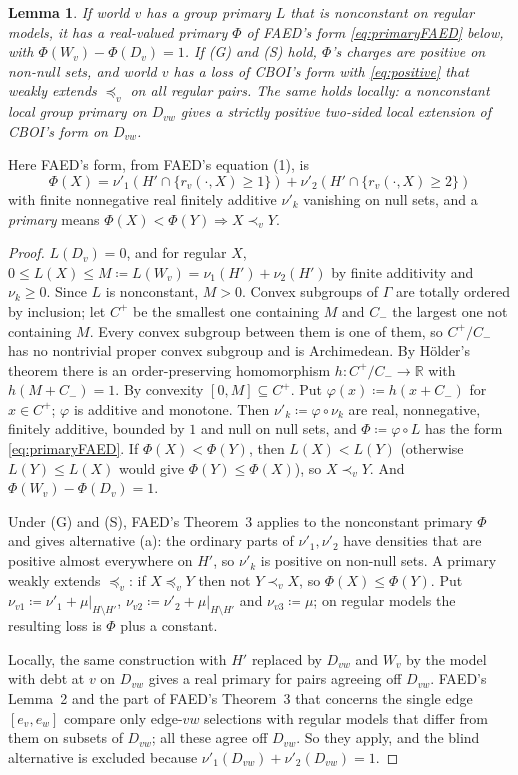 \documentclass[11pt]{article}
\newtheorem{lemma}[theorem]{Lemma}
\theoremstyle{definition}\newtheorem{definition}[theorem]{Definition}
\theoremstyle{remark}\newtheorem{remark}[theorem]{Remark}
\newcommand{\R}{\mathbb R}
\begin{document}
\begin{lemma}\label{lem:leading}
If world $v$ has a group primary $L$ that is nonconstant on regular models,
it has a real-valued primary $\Phi$ of FAED's form \eqref{eq:primaryFAED}
below, with $\Phi(W_v)-\Phi(D_v)=1$. If (G) and (S) hold, $\Phi$'s charges
are positive on non-null sets, and world $v$ has a loss of CBOI's form with
\eqref{eq:positive} that weakly extends $\preceq_v$ on all regular pairs.
The same holds locally: a nonconstant local group primary on $D_{vw}$ gives a
strictly positive two-sided local extension of CBOI's form on $D_{vw}$.
\end{lemma}
Here FAED's form, from FAED's equation (1), is
\begin{equation}
 \Phi(X)=\nu'_1(H'\cap\{r_v(\cdot,X)\ge1\})+\nu'_2(H'\cap\{r_v(\cdot,X)\ge2\})
 \label{eq:primaryFAED}
\end{equation}
with finite nonnegative real finitely additive $\nu'_k$ vanishing on null
sets, and a \emph{primary} means $\Phi(X)<\Phi(Y)\Rightarrow X\prec_vY$.
\begin{proof}
$L(D_v)=0$, and for regular $X$, $0\le L(X)\le M\coloneqq L(W_v)=\nu_1(H')+
\nu_2(H')$ by finite additivity and $\nu_k\ge0$. Since $L$ is nonconstant,
$M>0$. Convex subgroups of $\Gamma$ are totally ordered by inclusion; let
$C^+$ be the smallest one containing $M$ and $C_-$ the largest one not
containing $M$. Every convex subgroup between them is one of them, so
$C^+/C_-$ has no nontrivial proper convex subgroup and is Archimedean. By
H\"older's theorem \cite{Holder} there is an order-preserving homomorphism
$h\colon C^+/C_-\to\R$ with $h(M+C_-)=1$. By convexity $[0,M]\subseteq C^+$.
Put $\varphi(x)\coloneqq h(x+C_-)$ for $x\in C^+$; $\varphi$ is additive and
monotone. Then $\nu'_k\coloneqq\varphi\circ\nu_k$ are real, nonnegative,
finitely additive, bounded by $1$ and null on null sets, and
$\Phi\coloneqq\varphi\circ L$ has the form \eqref{eq:primaryFAED}. If
$\Phi(X)<\Phi(Y)$, then $L(X)<L(Y)$ (otherwise $L(Y)\le L(X)$ would give
$\Phi(Y)\le\Phi(X)$), so $X\prec_vY$. And $\Phi(W_v)-\Phi(D_v)=1$.

Under (G) and (S), FAED's Theorem~3 applies to the nonconstant primary
$\Phi$ and gives alternative (a): the ordinary parts of $\nu'_1,\nu'_2$ have
densities that are positive almost everywhere on $H'$, so $\nu'_k$ is
positive on non-null sets. A primary weakly extends $\preceq_v$: if
$X\preceq_vY$ then not $Y\prec_vX$, so $\Phi(X)\le\Phi(Y)$. Put
$\nu_{v1}\coloneqq\nu'_1+\mu|_{H\setminus H'}$,
$\nu_{v2}\coloneqq\nu'_2+\mu|_{H\setminus H'}$ and $\nu_{v3}\coloneqq\mu$;
on regular models the resulting loss is $\Phi$ plus a constant.

Locally, the same construction with $H'$ replaced by $D_{vw}$ and $W_v$ by
the model with debt at $v$ on $D_{vw}$ gives a real primary for pairs
agreeing off $D_{vw}$. FAED's Lemma~2 and the part of FAED's Theorem~3 that
concerns the single edge $[e_v,e_w]$ compare only edge-$vw$ selections with
regular models that differ from them on subsets of $D_{vw}$; all these agree
off $D_{vw}$. So they apply, and the blind alternative is excluded because
$\nu'_1(D_{vw})+\nu'_2(D_{vw})=1$.
\end{proof}
\end{document}
